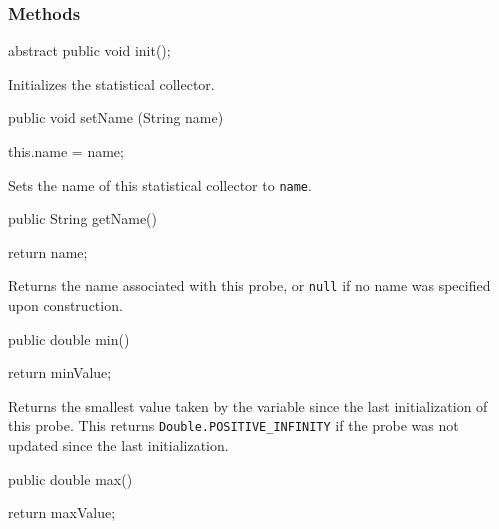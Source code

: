 \subsubsection* {Methods}
\begin{code}

   abstract public void init();
\end{code}
  \begin{tabb}  Initializes the statistical collector.
 \end{tabb}
\begin{code}

   public void setName (String name) \begin{hide} {
      this.name = name; 
   } \end{hide}
\end{code}
  \begin{tabb} Sets the name of this statistical collector to \texttt{name}.
 \end{tabb}
\begin{code}

   public String getName()\begin{hide} {
      return name;
   }\end{hide}
\end{code}
\begin{tabb}   Returns the name associated with this probe,
   or \texttt{null} if no name was specified upon construction.
\end{tabb}
\begin{htmlonly}
\end{htmlonly}
\begin{code}

   public double min() \begin{hide} { 
      return minValue; 
   } \end{hide}
\end{code}
  \begin{tabb}  Returns the smallest value taken by the variable 
   since the last initialization
   of this probe.
   This returns \texttt{Double.POSITIVE\_INFINITY}
   if the probe was not updated since the last initialization.
 \end{tabb}
\begin{htmlonly}
\end{htmlonly}
\begin{code}

   public double max() \begin{hide} { 
      return maxValue; 
   } \end{hide}
\end{code}
